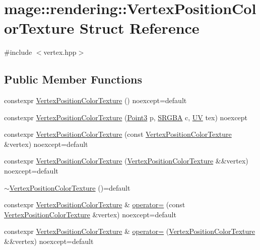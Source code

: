 \hypertarget{structmage_1_1rendering_1_1_vertex_position_color_texture}{}\section{mage\+:\+:rendering\+:\+:Vertex\+Position\+Color\+Texture Struct Reference}
\label{structmage_1_1rendering_1_1_vertex_position_color_texture}


{\ttfamily \#include $<$vertex.\+hpp$>$}

\subsection*{Public Member Functions}
\begin{DoxyCompactItemize}
\item 
constexpr \hyperlink{structmage_1_1rendering_1_1_vertex_position_color_texture_a17b6bdad1f02adb800161f0d3b37aff6}{Vertex\+Position\+Color\+Texture} () noexcept=default
\item 
constexpr \hyperlink{structmage_1_1rendering_1_1_vertex_position_color_texture_af0f240e5612ecb3151ebea1557fc6d16}{Vertex\+Position\+Color\+Texture} (\hyperlink{structmage_1_1_point3}{Point3} p, \hyperlink{structmage_1_1_s_r_g_b_a}{S\+R\+G\+BA} c, \hyperlink{structmage_1_1_u_v}{UV} tex) noexcept
\item 
constexpr \hyperlink{structmage_1_1rendering_1_1_vertex_position_color_texture_a16b7e031b692acf1be28b72ef3c5ff31}{Vertex\+Position\+Color\+Texture} (const \hyperlink{structmage_1_1rendering_1_1_vertex_position_color_texture}{Vertex\+Position\+Color\+Texture} \&vertex) noexcept=default
\item 
constexpr \hyperlink{structmage_1_1rendering_1_1_vertex_position_color_texture_a7747df2151f6b904570bcdcc96898c75}{Vertex\+Position\+Color\+Texture} (\hyperlink{structmage_1_1rendering_1_1_vertex_position_color_texture}{Vertex\+Position\+Color\+Texture} \&\&vertex) noexcept=default
\item 
\hyperlink{structmage_1_1rendering_1_1_vertex_position_color_texture_a702ec0ffbe8eae3db1e8149f3124135d}{$\sim$\+Vertex\+Position\+Color\+Texture} ()=default
\item 
constexpr \hyperlink{structmage_1_1rendering_1_1_vertex_position_color_texture}{Vertex\+Position\+Color\+Texture} \& \hyperlink{structmage_1_1rendering_1_1_vertex_position_color_texture_a8bb4077a1a8a1c838936157446d553af}{operator=} (const \hyperlink{structmage_1_1rendering_1_1_vertex_position_color_texture}{Vertex\+Position\+Color\+Texture} \&vertex) noexcept=default
\item 
constexpr \hyperlink{structmage_1_1rendering_1_1_vertex_position_color_texture}{Vertex\+Position\+Color\+Texture} \& \hyperlink{structmage_1_1rendering_1_1_vertex_position_color_texture_ad750863d48aee99752e84d37c50020ce}{operator=} (\hyperlink{structmage_1_1rendering_1_1_vertex_position_color_texture}{Vertex\+Position\+Color\+Texture} \&\&vertex) noexcept=default
\end{DoxyCompactItemize}

